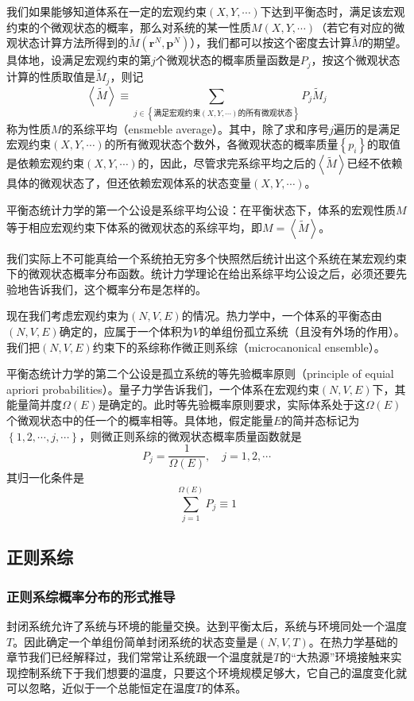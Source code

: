\documentclass[main.tex]{subfiles}
\begin{document}
我们如果能够知道体系在一定的宏观约束$\left(X,Y,\cdots\right)$下达到平衡态时，满足该宏观约束的个微观状态的概率，那么对系统的某一性质$M\left(X,Y,\cdots\right)$（若它有对应的微观状态计算方法所得到的$\tilde{M}\left(\mathbf{r}^N,\mathbf{p}^N\right)$），我们都可以按这个密度去计算$\tilde{M}$的期望。具体地，设满足宏观约束的第$j$个微观状态的概率质量函数是$P_j$，按这个微观状态计算的性质取值是$\tilde{M}_j$，则记
\[
    \left\langle\tilde{M}\right\rangle\equiv\sum_{j\in\left\{\text{满足宏观约束$\left(X,Y,\cdots\right)$的所有微观状态}\right\}}P_j\tilde{M}_j
\]
称为性质$M$的系综平均（ensmeble average）。其中，除了求和序号$j$遍历的是满足宏观约束$\left(X,Y,\cdots\right)$的所有微观状态个数外，各微观状态的概率质量$\left\{p_i\right\}$的取值是依赖宏观约束$\left(X,Y,\cdots\right)$的，因此，尽管求完系综平均之后的$\left\langle\tilde{M}\right\rangle$已经不依赖具体的微观状态了，但还依赖宏观体系的状态变量$\left(X,Y,\cdots\right)$。

平衡态统计力学的第一个公设是系综平均公设：在平衡状态下，体系的宏观性质$M$等于相应宏观约束下体系的微观状态的系综平均，即$M=\left\langle\tilde{M}\right\rangle$。

我们实际上不可能真给一个系统拍无穷多个快照然后统计出这个系统在某宏观约束下的微观状态概率分布函数。统计力学理论在给出系综平均公设之后，必须还要先验地告诉我们，这个概率分布是怎样的。

现在我们考虑宏观约束为$\left(N,V,E\right)$的情况。热力学中，一个体系的平衡态由$\left(N,V,E\right)$确定的，应属于一个体积为$V$的单组份孤立系统（且没有外场的作用）。我们把$\left(N,V,E\right)$约束下的系综称作微正则系综（microcanonical ensemble）。

平衡态统计力学的第二个公设是孤立系统的等先验概率原则（principle of equial apriori probabilities）。量子力学告诉我们，一个体系在宏观约束$\left(N,V,E\right)$下，其能量简并度$\Omega\left(E\right)$是确定的。此时等先验概率原则要求，实际体系处于这$\Omega\left(E\right)$个微观状态中的任一个的概率相等。具体地，假定能量$E$的简并态标记为$\left\{1,2,\cdots,j,\cdots\right\}$，则微正则系综的微观状态概率质量函数就是
\[P_j=\frac{1}{\Omega\left(E\right)},\quad j=1,2,\cdots\]
其归一化条件是
\[\sum_{j=1}^{\Omega\left(E\right)}P_j\equiv 1\]

\subsection{正则系综}
\subsubsection{正则系综概率分布的形式推导}
封闭系统允许了系统与环境的能量交换。达到平衡太后，系统与环境同处一个温度$T$。因此确定一个单组份简单封闭系统的状态变量是$\left(N,V,T\right)$。在热力学基础的章节我们已经解释过，我们常常让系统跟一个温度就是$T$的“大热源”环境接触来实现控制系统下于我们想要的温度，只要这个环境规模足够大，它自己的温度变化就可以忽略，近似于一个总能恒定在温度$T$的体系。
\end{document}
